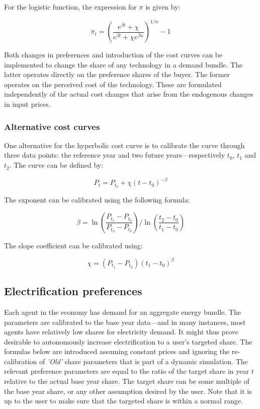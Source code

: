 \documentclass[11pt,letterpaper]{report}
\begin{document}
\noindent For the logistic function, the expression for $\pi$ is given by:

\[
\pi_t =
   \left( \frac{e^{\beta t} + \chi}{e^{\beta t} + \chi e^{\beta n}}
   \right)^{1/n} -1
\]

Both changes in preferences and introduction of the cost curves can be
implemented to change the share of any technology in a demand bundle. The latter
operates directly on the preference shares of the buyer. The former operates on
the perceived cost of the technology. These are formulated independently of the
actual cost changes that arise from the endogenous changes in input prices.

\subsubsection{Alternative cost curves}

One alternative for the hyperbolic cost curve is to calibrate the curve through
three data points: the reference year and two future years---respectively $t_0$,
$t_1$ and $t_2$. The curve can be defined by:

\[
P_t = P_{t_0} + \chi \left(t-t_0\right)^{-\beta}
\]

\noindent The exponent can be calibrated using the following formula:

\[
\beta = \ln \left( \frac{P_{t_1}-P_{t_0}}{P_{t_2}-P_{t_0}} \right) /
\ln \left( \frac{t_2 - t_0}{t_1 -  t_0} \right)
\]

\noindent The slope coefficient can be calibrated using:

\[
\chi = \left(P_{t_1} - P_{t_0}\right) \left(t_1-t_0\right)^{\beta}
\]

\subsection{Electrification preferences}

Each agent in the economy has demand for an aggregate
energy bundle. The parameters are calibrated to the
base year data---and in many instances, most agents
have relatively low shares for electricity demand. It might
thus prove desirable to autonomously increase electrification
to a user's targeted share. The formulas below
are introduced assuming constant prices and ignoring
the re-calibration of \emph{'Old'} share parameters
that is part of a dynamic simulation. The relevant
preference parameters are equal to the ratio
of the target share in year $t$ relative to the
actual base year share. The target share can be some
multiple of the base year share, or any other assumption
desired by the user. Note that it is up to the user to
make sure that the targeted share is within a normal
range.
\end{document}
